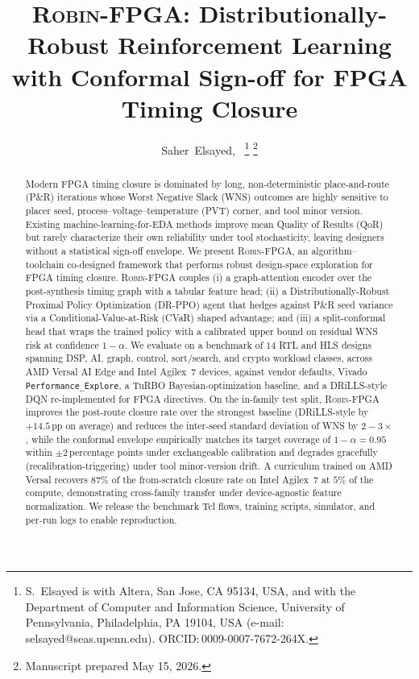 \documentclass[journal,onecolumn=false]{IEEEtran}
\title{\textsc{Robin-FPGA}: Distributionally-Robust Reinforcement Learning with Conformal Sign-off for FPGA Timing Closure}
\author{Saher~Elsayed,~\IEEEmembership{Member,~IEEE}%
  \thanks{S.~Elsayed is with Altera, San Jose, CA 95134, USA, and with the Department of Computer and Information Science, University of Pennsylvania, Philadelphia, PA 19104, USA (e-mail: selsayed@seas.upenn.edu). ORCID:\,0009-0007-7672-264X.}%
  \thanks{Manuscript prepared May 15, 2026.}}
\begin{document}
\maketitle

\begin{abstract}
Modern FPGA timing closure is dominated by long, non-deterministic place-and-route (P\&R) iterations whose Worst Negative Slack (WNS) outcomes are highly sensitive to placer seed, process--voltage--temperature (PVT) corner, and tool minor version. Existing machine-learning-for-EDA methods improve mean Quality of Results (QoR) but rarely characterize their own reliability under tool stochasticity, leaving designers without a statistical sign-off envelope. We present \textsc{Robin-FPGA}, an algorithm--toolchain co-designed framework that performs robust design-space exploration for FPGA timing closure. \textsc{Robin-FPGA} couples (i) a graph-attention encoder over the post-synthesis timing graph with a tabular feature head; (ii) a Distributionally-Robust Proximal Policy Optimization (DR-PPO) agent that hedges against P\&R seed variance via a Conditional-Value-at-Risk (CVaR) shaped advantage; and (iii) a split-conformal head that wraps the trained policy with a calibrated upper bound on residual WNS risk at confidence $1{-}\alpha$. We evaluate on a benchmark of $14$ RTL and HLS designs spanning DSP, AI, graph, control, sort/search, and crypto workload classes, across AMD Versal AI Edge and Intel Agilex~7 devices, against vendor defaults, Vivado \texttt{Performance\_Explore}, a TuRBO Bayesian-optimization baseline, and a DRiLLS-style DQN re-implemented for FPGA directives. On the in-family test split, \textsc{Robin-FPGA} improves the post-route closure rate over the strongest baseline (DRiLLS-style by $+14.5$\,pp on average) and reduces the inter-seed standard deviation of WNS by $2\!-\!3{\times}$, while the conformal envelope empirically matches its target coverage of $1{-}\alpha = 0.95$ within $\pm 2$\,percentage points under exchangeable calibration and degrades gracefully (recalibration-triggering) under tool minor-version drift. A curriculum trained on AMD Versal recovers $87\%$ of the from-scratch closure rate on Intel Agilex~7 at $5\%$ of the compute, demonstrating cross-family transfer under device-agnostic feature normalization. We release the benchmark Tcl flows, training scripts, simulator, and per-run logs to enable reproduction.
\end{abstract}
\end{document}
